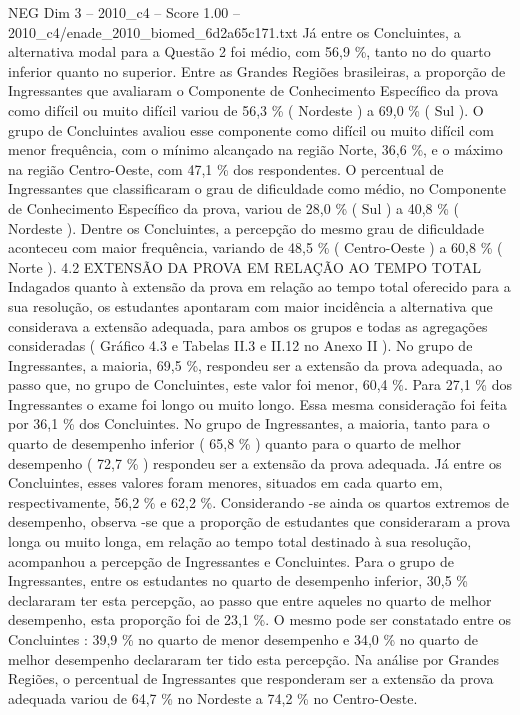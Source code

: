 \begin{textsample}{NEG Dim 3 – 2010\_c4 – Score 1.00 – 2010\_c4/enade\_2010\_biomed\_6d2a65c171.txt}
Já entre os Concluintes, a alternativa modal para a Questão 2 foi médio, com 56,9 \%, tanto no do quarto inferior quanto no superior.
Entre as Grandes Regiões brasileiras, a proporção de Ingressantes que avaliaram o Componente de Conhecimento Específico da prova como difícil ou muito difícil variou de 56,3 \% ( Nordeste ) a 69,0 \% ( Sul ).
O grupo de Concluintes avaliou esse componente como difícil ou muito difícil com menor frequência, com o mínimo alcançado na região Norte, 36,6 \%, e o máximo na região Centro-Oeste, com 47,1 \% dos respondentes.
O percentual de Ingressantes que classificaram o grau de dificuldade como médio, no Componente de Conhecimento Específico da prova, variou de 28,0 \% ( Sul ) a 40,8 \% ( Nordeste ).
Dentre os Concluintes, a percepção do mesmo grau de dificuldade aconteceu com maior frequência, variando de 48,5 \% ( Centro-Oeste ) a 60,8 \% ( Norte ). 4.2 EXTENSÃO DA PROVA EM RELAÇÃO AO TEMPO TOTAL Indagados quanto à extensão da prova em relação ao tempo total oferecido para a sua resolução, os estudantes apontaram com maior incidência a alternativa que considerava a extensão adequada, para ambos os grupos e todas as agregações consideradas ( Gráfico 4.3 e Tabelas II.3 e II.12 no Anexo II ).
No grupo de Ingressantes, a maioria, 69,5 \%, respondeu ser a extensão da prova adequada, ao passo que, no grupo de Concluintes, este valor foi menor, 60,4 \%.
Para 27,1 \% dos Ingressantes o exame foi longo ou muito longo.
Essa mesma consideração foi feita por 36,1 \% dos Concluintes.
No grupo de Ingressantes, a maioria, tanto para o quarto de desempenho inferior ( 65,8 \% ) quanto para o quarto de melhor desempenho ( 72,7 \% ) respondeu ser a extensão da prova adequada.
Já entre os Concluintes, esses valores foram menores, situados em cada quarto em, respectivamente, 56,2 \% e 62,2 \%.
Considerando -se ainda os quartos extremos de desempenho, observa -se que a proporção de estudantes que consideraram a prova longa ou muito longa, em relação ao tempo total destinado à sua resolução, acompanhou a percepção de Ingressantes e Concluintes.
Para o grupo de Ingressantes, entre os estudantes no quarto de desempenho inferior, 30,5 \% declararam ter esta percepção, ao passo que entre aqueles no quarto de melhor desempenho, esta proporção foi de 23,1 \%.
O mesmo pode ser constatado entre os Concluintes : 39,9 \% no quarto de menor desempenho e 34,0 \% no quarto de melhor desempenho declararam ter tido esta percepção.
Na análise por Grandes Regiões, o percentual de Ingressantes que responderam ser a extensão da prova adequada variou de 64,7 \% no Nordeste a 74,2 \% no Centro-Oeste.

\end{textsample}
